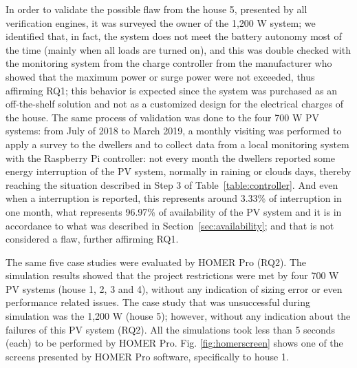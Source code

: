 \documentclass[review]{elsarticle}
\begin{document}
In order to validate the possible flaw from the house 5, presented by all verification engines, it was surveyed the owner of the 1,200 W system; we identified that, in fact, the system does not meet the battery autonomy most of the time (mainly when all loads are turned on), and this was double checked with the monitoring system from the charge controller from the manufacturer who showed that the maximum power or surge power were not exceeded, thus affirming RQ1; this behavior is expected since the system was purchased as an off-the-shelf solution and not as a customized design for the electrical charges of the house. The same process of validation was done to the four 700 W PV systems: from July of 2018 to March 2019, a monthly visiting was performed to apply a survey to the dwellers and to collect data from a local monitoring system with the Raspberry Pi controller: not every month the dwellers reported some energy interruption of the PV system, normally in raining or clouds days, thereby reaching the situation described in Step 3 of Table~\ref{table:controller}. And even when a interruption is reported, this represents around 3.33\% of interruption in one month, what represents 96.97\% of availability of the PV system and it is in accordance to what was described in Section~\ref{sec:availability}; and that is not considered a flaw, further affirming RQ1.

The same five case studies were evaluated by HOMER Pro (RQ2). The simulation results showed that the project restrictions were met by four 700 W PV systems (house 1, 2, 3 and 4), without any indication of sizing error or even performance related issues. The case study that was unsuccessful during simulation was the 1,200 W (house 5); however, without any indication about the failures of this PV system (RQ2). All the simulations took less than 5 seconds (each) to be performed by HOMER Pro. Fig. \ref{fig:homerscreen} shows one of the screens presented by HOMER Pro software, specifically to house 1.
\end{document}
